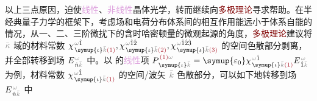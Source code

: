 以上三点原因，迫使\textcolor{Plum}{线性}、\textcolor{Plum}{非线性}\textcolor{PineGreen}{晶体光学}，转而继续向\textcolor{Maroon}{多极理论}寻求帮助。在半经典量子力学的框架下，考虑场和电荷分布体系间的相互作用能远小于体系自能的情况，从一、二、三阶\textcolor{NavyBlue}{微扰}下的含时\textcolor{NavyBlue}{哈密顿量}的微观起源的角度，\textcolor{Maroon}{多极理论}建议将 $\mathcolor{gray}{\bar{\kappa}}$ 域的材料常数 $\chi^{\;\! \mathcolor{gray}{\omega} \hat{1}}_{\;\! \symup{\iota} \mathcolor{gray}{\bar{k}} \textcolor{Maroon}{(1)}}, \chi^{\;\! \mathcolor{gray}{\omega} \hat{1} \hat{2}}_{\;\! \symup{\iota} \mathcolor{gray}{\bar{k}} \textcolor{Maroon}{(2)}}, \chi^{\;\! \mathcolor{gray}{\omega} \hat{1} \hat{2} \hat{3}}_{\;\! \symup{\iota} \mathcolor{gray}{\bar{k}} \textcolor{Maroon}{(3)}}$ 的空间\textcolor{NavyBlue}{色散}部分剥离，并全部转移到场 $E^{\;\!\mathcolor{gray}{\omega}}_{\;\! \hat{n} \mathcolor{gray}{\bar{k}}}$ 中。以  的\textcolor{Plum}{线性}项 $P^{\;\! \textcolor{Maroon}{(1)} \mathcolor{gray}{\omega}}_{\;\! \symup{\iota}\mathcolor{gray}{\bar{k}}} = {\symup{\varepsilon_0}} \chi^{\;\! \mathcolor{gray}{\omega} \hat{1}}_{\;\! \symup{\iota} \mathcolor{gray}{\bar{k}} \textcolor{Maroon}{(1)}} E^{\;\!\mathcolor{gray}{\omega}}_{\;\! \hat{1} \mathcolor{gray}{\bar{k}}}$ 为例，材料常数 $\chi^{\;\! \mathcolor{gray}{\omega} \hat{1}}_{\;\! \symup{\iota} \mathcolor{gray}{\bar{k}} \textcolor{Maroon}{(1)}}$ 的空间/\textcolor{PineGreen}{波矢} $\mathcolor{gray}{\bar{k}}$ \textcolor{NavyBlue}{色散}部分，可以如下地转移到场 $E^{\;\!\mathcolor{gray}{\omega}}_{\;\! \hat{n} \mathcolor{gray}{\bar{k}}}$ 中
